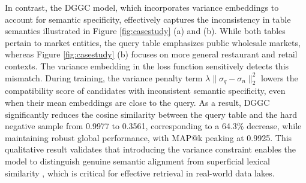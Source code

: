 In contrast, the DGGC model, which incorporates variance embeddings to account for semantic specificity, effectively captures the inconsistency in table semantics illustrated in Figure \ref{fig:casestudy} (a) and (b). While both tables pertain to market entities, the query table emphasizes public wholesale markets, whereas Figure \ref{fig:casestudy} (b) focuses on more general restaurant and retail contexts. The variance embedding in the loss function sensitively detects this mismatch. During training, the variance penalty term $\lambda\|\sigma_q-\sigma_n\|_2^2$ lowers the compatibility score of candidates with inconsistent semantic specificity, even when their mean embeddings are close to the query. As a result, DGGC significantly reduces the cosine similarity between the query table and the hard negative sample from 0.9977 to 0.3561, corresponding to a 64.3\% decrease, while maintaining robust global performance, with MAP@k peaking at 0.9925. This qualitative result validates that introducing the variance constraint enables the model to distinguish genuine semantic alignment \cite{karpukhin2020dense} from superficial lexical similarity \cite{robertson2009probabilistic}, which is critical for effective retrieval in real-world data lakes.
